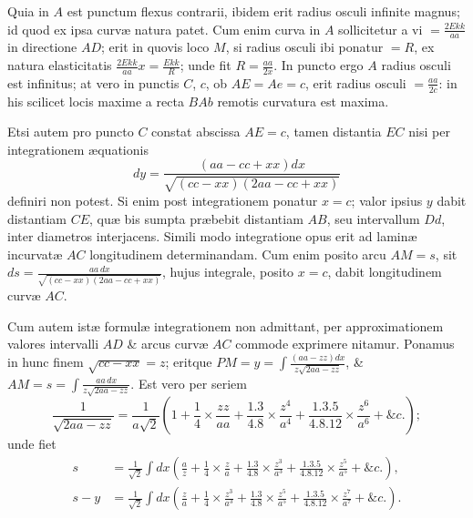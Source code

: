 Quia in $A$ est punctum flexus contrarii, ibidem erit radius osculi infinite magnus; id quod ex ipsa curvæ natura patet. Cum enim curva in $A$ sollicitetur a vi $=\frac{2Ekk}{aa}$ in directione $AD$; erit in quovis loco $M$, si radius osculi ibi ponatur $=R$, ex natura elasticitatis $\frac{2Ekk}{aa}x=\frac{Ekk}R$; unde fit $R=\frac{aa}{2x}$. In puncto ergo $A$ radius osculi est infinitus; at vero in punctis $C$, $c$, ob $AE=Ae=c$, erit radius osculi $=\frac{aa}{2c}$: in his scilicet locis maxime a recta $BAb$ remotis curvatura est maxima.

Etsi autem pro puncto $C$ constat abscissa $AE=c$, tamen distantia $EC$ nisi per integrationem æquationis
\[dy=\frac{(aa-cc+xx)dx}{\sqrt{(cc-xx)(2aa-cc+xx)}}\]
definiri non potest. Si enim post integrationem ponatur $x=c$; valor ipsius $y$ dabit distantiam $CE$, quæ bis sumpta præbebit distantiam $AB$, seu intervallum $Dd$, inter diametros interjacens. Simili modo
integratione opus erit ad laminæ incurvatæ $AC$ longitudinem determinandam. Cum enim posito arcu $AM=s$, sit $ds=\frac{aa\,dx}{\sqrt{(cc-xx)(2aa-cc+xx)}}$, hujus integrale, posito $x=c$, dabit longitudinem curvæ $AC$.

Cum autem istæ formulæ integrationem non admittant, per approximationem valores intervalli $AD$ \& arcus curvæ $AC$ commode exprimere nitamur. Ponamus in hunc finem $\sqrt{cc-xx}=z$; eritque $PM=y=\int\frac{(aa-zz)dx}{z\sqrt{2aa-zz}}$, \& $AM=s=\int\frac{aa\,dx}{z\sqrt{2aa-zz}}$. Est vero per seriem
\[\frac1{\sqrt{2aa-zz}}=\frac1{a\sqrt2}\left(1+\frac14\times\frac{zz}{aa}+\frac{1.3}{4.8}\times\frac{z^4}{a^4}+\frac{1.3.5}{4.8.12}\times\frac{z^6}{a^6}+\&c.\right);\]
unde fiet
\[\begin{aligned}
s&=\frac1{\sqrt2}\int dx\left(\frac az+\frac14\times\frac za+\frac{1.3}{4.8}\times\frac{z^3}{a^3}+\frac{1.3.5}{4.8.12}\times\frac{z^5}{a^5}+\&c.\right),\\
s-y&=\frac1{\sqrt2}\int dx\left(\frac za+\frac14\times\frac{z^3}{a^3}+\frac{1.3}{4.8}\times\frac{z^5}{a^5}+\frac{1.3.5}{4.8.12}\times\frac{z^7}{a^7}+\&c.\right).
\end{aligned}\]

